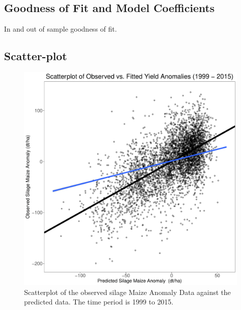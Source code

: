 \documentclass[12pt]{iopart}
\begin{document}
\subsection{Goodness of Fit and Model Coefficients}
In and out of sample goodness of fit.

\subsection{Scatter-plot}

\label{scatter:1}

\begin{figure}
	\label{scatter:1f}
	\centering
	\includegraphics[width=1\textwidth]{figures/Train_1999-2015.pdf}
	\caption{Scatterplot of the observed silage Maize Anomaly Data against the predicted data. The time period is 1999 to 2015.}
\end{figure}
\end{document}
